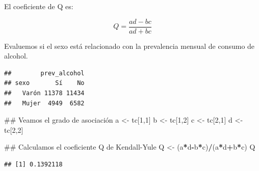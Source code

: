 \documentclass[spanish,]{book}
\newenvironment{Shaded}{\begin{snugshade}}{\end{snugshade}}
\newcommand{\KeywordTok}[1]{\textcolor[rgb]{0.13,0.29,0.53}{\textbf{#1}}}
\newcommand{\DataTypeTok}[1]{\textcolor[rgb]{0.13,0.29,0.53}{#1}}
\newcommand{\DecValTok}[1]{\textcolor[rgb]{0.00,0.00,0.81}{#1}}
\newcommand{\StringTok}[1]{\textcolor[rgb]{0.31,0.60,0.02}{#1}}
\newcommand{\OperatorTok}[1]{\textcolor[rgb]{0.81,0.36,0.00}{\textbf{#1}}}
\newcommand{\NormalTok}[1]{#1}
\begin{document}
El coeficiente de Q es:

\[
Q = \frac{ad - bc}{ad + bc}
\]

Evaluemos si el sexo está relacionado con la prevalencia mensual de
consumo de alcohol.

\begin{Shaded}
\end{Shaded}

\begin{verbatim}
##        prev_alcohol
## sexo       Sí    No
##   Varón 11378 11434
##   Mujer  4949  6582
\end{verbatim}

\begin{Shaded}
\begin{Highlighting}[]
\NormalTok{## Veamos el grado de asociación}
\NormalTok{a <-}\StringTok{ }\NormalTok{tc[}\DecValTok{1}\NormalTok{,}\DecValTok{1}\NormalTok{]}
\NormalTok{b <-}\StringTok{ }\NormalTok{tc[}\DecValTok{1}\NormalTok{,}\DecValTok{2}\NormalTok{]}
\NormalTok{c <-}\StringTok{ }\NormalTok{tc[}\DecValTok{2}\NormalTok{,}\DecValTok{1}\NormalTok{]}
\NormalTok{d <-}\StringTok{ }\NormalTok{tc[}\DecValTok{2}\NormalTok{,}\DecValTok{2}\NormalTok{]}


\NormalTok{## Calculamos el coeficiente Q de Kendall-Yule}
\NormalTok{Q <-}\StringTok{ }\NormalTok{(a}\OperatorTok{*}\NormalTok{d}\OperatorTok{-}\NormalTok{b}\OperatorTok{*}\NormalTok{c)}\OperatorTok{/}\NormalTok{(a}\OperatorTok{*}\NormalTok{d}\OperatorTok{+}\NormalTok{b}\OperatorTok{*}\NormalTok{c)}
\NormalTok{Q}
\end{Highlighting}
\end{Shaded}

\begin{verbatim}
## [1] 0.1392118
\end{verbatim}
\end{document}
